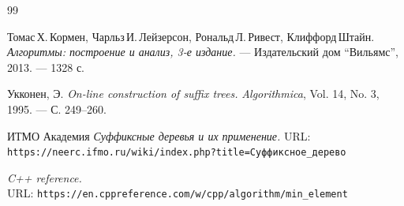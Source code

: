 \begin{thebibliography}{99}

Томас\,Х.\,Кормен, Чарльз\,И.\,Лейзерсон, Рональд\,Л.\,Ривест, Клиффорд\,Штайн.
{\itshape Алгоритмы: построение и анализ, 3-е издание.} --- Издательский дом \enquote{Вильямс}, 2013. --- 1328 с.

Укконен, Э.
{\itshape On-line construction of suffix trees.}
{\itshape Algorithmica}, Vol. 14, No. 3, 1995. --- С. 249--260.

ИТМО Академия
{\itshape Суффиксные деревья и их применение.}
URL: \texttt{https://neerc.ifmo.ru/wiki/index.php?title=Суффиксное\_дерево}

{\itshape C++ reference.} \\URL: \texttt{https://en.cppreference.com/w/cpp/algorithm/min\_element}

\end{thebibliography}
\pagebreak
